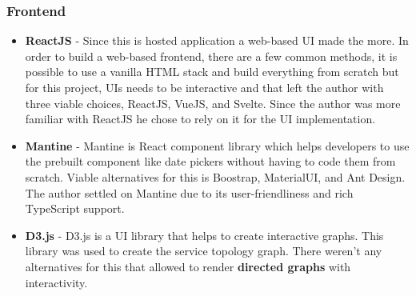\subsubsection{Frontend}
\begin{itemize}
    \item \textbf{ReactJS} - Since this is hosted application a web-based UI made the more. In order to build a web-based frontend, there are a few common methods, it is possible to use a vanilla HTML stack and build everything from scratch but for this project, UIs needs to be interactive and that left the author with three viable choices, ReactJS, VueJS, and Svelte. Since the author was more familiar with ReactJS he chose to rely on it for the UI implementation.
    \item \textbf{Mantine} - Mantine is React component library which helps developers to use the prebuilt component like date pickers without having to code them from scratch. Viable alternatives for this is Boostrap, MaterialUI, and Ant Design. The author settled on Mantine due to its user-friendliness and rich TypeScript support.
    \item \textbf{D3.js} - D3.js is a UI library that helps to create interactive graphs. This library was used to create the service topology graph. There weren't any alternatives for this that allowed to render \textbf{directed graphs} with interactivity.
\end{itemize}


